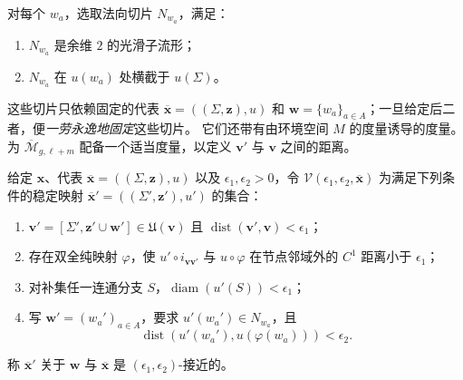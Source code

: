 对每个 $w_a$，选取法向切片 $N_{w_a}$，满足：
\begin{condition}[法向切片]\label{cond:normal-slices}
\begin{enumerate}[label=(\arabic*)]
 \item $N_{w_a}$ 是余维 $2$ 的光滑子流形；
 \item $N_{w_a}$ 在 $u(w_a)$ 处横截于 $u(\Sigma)$。
\end{enumerate}
\end{condition}

这些切片只依赖固定的代表
$\overline{\mathbf x}=((\Sigma,\boldsymbol z),u)$ 和
$\boldsymbol w=\{w_a\}_{a\in A}$；一旦给定后二者，便\emph{一劳永逸地固定}这些切片。
它们还带有由环境空间 $M$ 的度量诱导的度量。为
$\overline{\mathcal M}_{g,\ell+m}$ 配备一个适当度量，以定义
$\mathbf v'$ 与 $\mathbf v$ 之间的距离。

\begin{definition}[稳定化]\label{def:stabilization-neighborhood-general-case}
给定 $\mathbf x$、代表 $\overline{\mathbf x}=((\Sigma,\boldsymbol z),u)$ 以及
$\epsilon_1,\epsilon_2>0$，令
$\mathcal V(\epsilon_1,\epsilon_2,\overline{\mathbf x})$ 为满足下列条件的稳定映射
$\overline{\mathbf x}'=((\Sigma',\boldsymbol z'),u')$ 的集合：
\begin{enumerate}[label=(\arabic*)]
 \item $\mathbf v'=[\Sigma',\boldsymbol z'\cup\boldsymbol w']
 \in\mathfrak U(\mathbf v)$ 且
 $\operatorname{dist}(\mathbf v',\mathbf v)<\epsilon_1$；
 \item 存在双全纯映射 $\varphi$，使
 $u'\circ i_{\mathbf v\mathbf v'}$ 与 $u\circ\varphi$ 在节点邻域外的
 $C^1$ 距离小于 $\epsilon_1$；
 \item 对补集任一连通分支 $S$，$\operatorname{diam}(u'(S))<\epsilon_1$；
 \item 写 $\boldsymbol w'=(w_a')_{a\in A}$，要求
 $u'(w_a')\in N_{w_a}$，且
 \[
  \operatorname{dist}(u'(w_a'),u(\varphi(w_a)))<\epsilon_2.
 \]
\end{enumerate}
称 $\overline{\mathbf x}'$ 关于 $\boldsymbol w$ 与
$\overline{\mathbf x}$ 是 $(\epsilon_1,\epsilon_2)$-接近的。
\end{definition}

